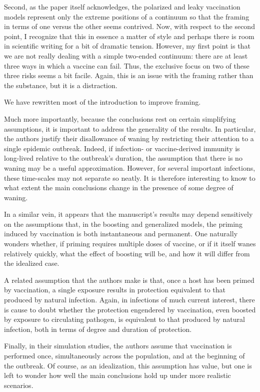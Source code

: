 \documentclass[12pt]{article}
\newcommand{\revtext}{\textsf}
\begin{document}
\revtext{Second, as the paper itself acknowledges, the polarized and leaky vaccination models represent only the extreme positions of a continuum so that the framing in terms of one versus the other seems contrived. Now, with respect to the second point, I recognize that this in essence a matter of style and perhaps there is room in scientific writing for a bit of dramatic tension. However, my first point is that we are not really dealing with a simple two-ended continuum: there are at least three ways in which a vaccine can fail. Thus, the exclusive focus on two of these three risks seems a bit facile. Again, this is an issue with the framing rather than the substance, but it is a distraction.}

We have rewritten most of the introduction to improve framing.

\revtext{Much more importantly, because the conclusions rest on certain simplifying assumptions, it is important to address the generality of the results. In particular, the authors justify their disallowance of waning by restricting their attention to a single epidemic outbreak. Indeed, if infection- or vaccine-derived immunity is long-lived relative to the outbreak’s duration, the assumption that there is no waning may be a useful approximation. However, for several important infections, these time-scales may not separate so neatly. It is therefore interesting to know to what extent the main conclusions change in the presence of some degree of waning.}

\revtext{In a similar vein, it appears that the manuscript’s results may depend sensitively on the assumptions that, in the boosting and generalized models, the priming induced by vaccination is both instantaneous and permanent. One naturally wonders whether, if priming requires multiple doses of vaccine, or if it itself wanes relatively quickly, what the effect of boosting will be, and how it will differ from the idealized case.}

\revtext{A related assumption that the authors make is that, once a host has been primed by vaccination, a single exposure results in protection equivalent to that produced by natural infection. Again, in infections of much current interest, there is cause to doubt whether the protection engendered by vaccination, even boosted by exposure to circulating pathogen, is equivalent to that produced by natural infection, both in terms of degree and duration of protection.}

\revtext{Finally, in their simulation studies, the authors assume that vaccination is performed once, simultaneously across the population, and at the beginning of the outbreak. Of course, as an idealization, this assumption has value, but one is left to wonder how well the main conclusions hold up under more realistic scenarios.}
\end{document}
